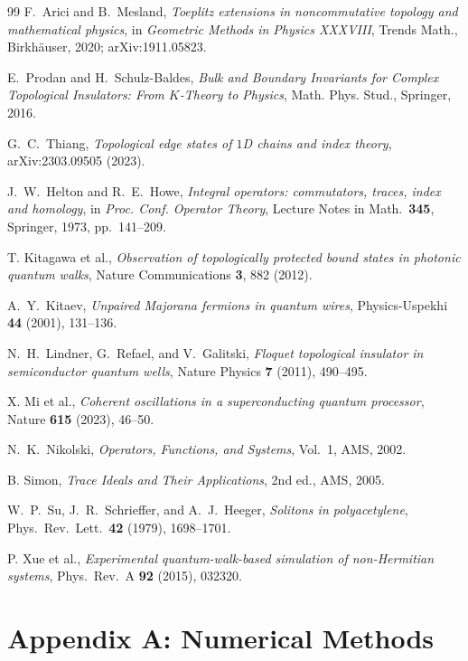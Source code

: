 \documentclass[10pt]{amsart}
\newcommand{\1}{{\mathbb{I}}}
\numberwithin{equation}{section}
\begin{document}
\begin{thebibliography}{99}
F.\ Arici and B.\ Mesland, \emph{Toeplitz extensions in noncommutative topology and
mathematical physics}, in \emph{Geometric Methods in Physics XXXVIII}, Trends Math.,
Birkh\"auser, 2020; arXiv:1911.05823.

E.\ Prodan and H.\ Schulz-Baldes, \emph{Bulk and Boundary Invariants for Complex Topological
Insulators: From $K$-Theory to Physics}, Math. Phys. Stud., Springer, 2016.

G.\ C.\ Thiang, \emph{Topological edge states of $1$D chains and index theory},
arXiv:2303.09505 (2023).

J.\ W.\ Helton and R.\ E.\ Howe, \emph{Integral operators: commutators, traces, index and
homology}, in \emph{Proc. Conf. Operator Theory}, Lecture Notes in Math.\ \textbf{345},
Springer, 1973, pp.\ 141--209.

T. Kitagawa et al., \emph{Observation of topologically protected bound states in photonic
quantum walks}, Nature Communications \textbf{3}, 882 (2012).

A.\ Y.\ Kitaev, \emph{Unpaired Majorana fermions in quantum wires}, Physics-Uspekhi
\textbf{44} (2001), 131--136.

N.\ H.\ Lindner, G.\ Refael, and V.\ Galitski, \emph{Floquet topological insulator in
semiconductor quantum wells}, Nature Physics \textbf{7} (2011), 490--495.

X. Mi et al., \emph{Coherent oscillations in a superconducting quantum processor}, Nature
\textbf{615} (2023), 46--50.

N.\ K.\ Nikolski, \emph{Operators, Functions, and Systems}, Vol.\ 1, AMS, 2002.

B. Simon, \emph{Trace Ideals and Their Applications}, 2nd ed., AMS, 2005.

W.\ P.\ Su, J.\ R.\ Schrieffer, and A.\ J.\ Heeger, \emph{Solitons in polyacetylene},
Phys.\ Rev.\ Lett.\ \textbf{42} (1979), 1698--1701.

P. Xue et al., \emph{Experimental quantum-walk-based simulation of non-Hermitian systems},
Phys.\ Rev.\ A \textbf{92} (2015), 032320.

\end{thebibliography}

\appendix
\section*{Appendix A: Numerical Methods}
\label{app:numerics}
\end{document}
